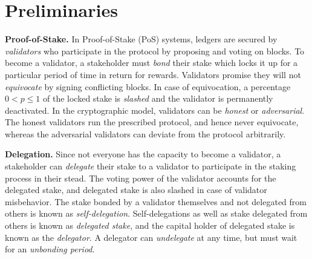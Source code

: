 \section{Preliminaries}\label{sec:preliminaries}


\noindent
\textbf{Proof-of-Stake.} In Proof-of-Stake (PoS) systems, ledgers are secured
by \emph{validators} who participate in the protocol by proposing and voting
on blocks. To become a validator, a stakeholder must \emph{bond} their stake
which locks it up for a particular period of time in return for rewards.
Validators promise they will
not \emph{equivocate} by signing conflicting blocks.
In case of equivocation, a percentage $0 < p \leq 1$ of the locked stake is
\emph{slashed} and the validator is permanently deactivated. In the cryptographic
model, validators can be \emph{honest} or \emph{adversarial}. The honest validators
run the prescribed protocol, and hence never equivocate, whereas the adversarial
validators can deviate from the protocol arbitrarily.


\noindent
\textbf{Delegation.} Since not everyone has the capacity to become a validator,
a stakeholder can \emph{delegate} their stake to a validator to participate in
the staking process in their stead. The voting power of the validator accounts
for the delegated stake, and delegated stake is also slashed in case of validator
misbehavior. The stake bonded by a validator themselves and not delegated from
others is known as \emph{self-delegation}. Self-delegations as
well as stake delegated from others is known as \emph{delegated stake},
and the capital holder of delegated stake is known as the \emph{delegator}.
A delegator can \emph{undelegate} at any time, but must wait for an
\emph{unbonding period}.

